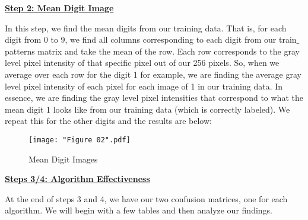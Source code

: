\documentclass[final,12pt,reqno]{amsart}
\begin{document}
\underline{\textbf{Step 2: Mean Digit Image}}

In this step, we find the mean digits from our training data. That is, for each digit from 0 to 9, we find all columns corresponding to each digit from our train$\_$patterns matrix and take the mean of the row. Each row corresponds to the gray level pixel intensity of that specific pixel out of our 256 pixels. So, when we average over each row for the digit 1 for example, we are finding the average gray level pixel intensity of each pixel for each image of 1 in our training data. In essence, we are finding the gray level pixel intensities that correspond to what the mean digit 1 looks like from our training data (which is correctly labeled). We repeat this for the other digits and the results are below:

\begin{figure}[hbtp]
  \begin{center}
    \texttt{[image: "Figure 02".pdf]}
    \caption{Mean Digit Images}
  \end{center}
\end{figure}

\underline{\textbf{Steps 3/4: Algorithm Effectiveness}}

At the end of steps 3 and 4, we have our two confusion matrices, one for each algorithm. We will begin with a few tables and then analyze our findings.
\end{document}
